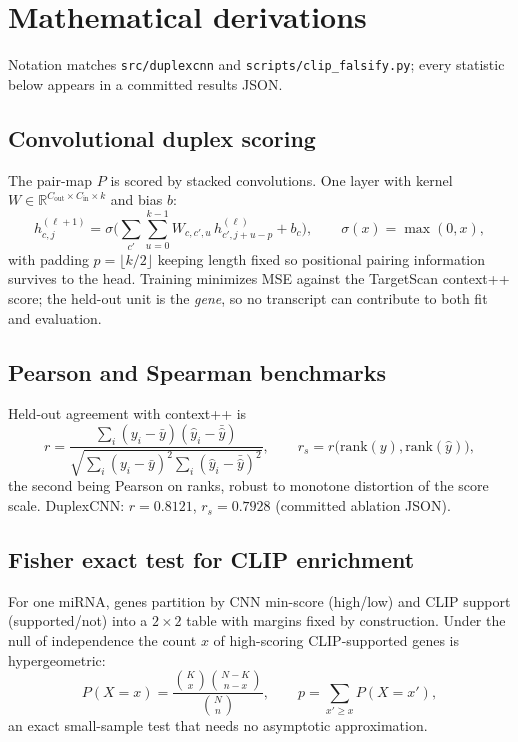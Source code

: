 \section{Mathematical derivations}
Notation matches \texttt{src/duplexcnn} and \texttt{scripts/clip\_falsify.py};
every statistic below appears in a committed results JSON.

\subsection{Convolutional duplex scoring}
The pair-map $P$ is scored by stacked convolutions. One layer with kernel $W\in\mathbb R^{C_{\text{out}}\times C_{\text{in}}\times k}$ and bias $b$:
\begin{equation}
h^{(\ell+1)}_{c,j}=\sigma\Big(\sum_{c'}\sum_{u=0}^{k-1}W_{c,c',u}\,h^{(\ell)}_{c',j+u-p}+b_c\Big),\qquad
\sigma(x)=\max(0,x),
\end{equation}
with padding $p=\lfloor k/2\rfloor$ keeping length fixed so positional pairing
information survives to the head. Training minimizes MSE against the
TargetScan context++ score; the held-out unit is the \emph{gene}, so no
transcript can contribute to both fit and evaluation.

\subsection{Pearson and Spearman benchmarks}
Held-out agreement with context++ is
\begin{equation}
r=\frac{\sum_i(y_i-\bar y)(\hat y_i-\bar{\hat y})}{\sqrt{\sum_i(y_i-\bar y)^2\sum_i(\hat y_i-\bar{\hat y})^2}},\qquad
r_s=r\big(\mathrm{rank}(y),\mathrm{rank}(\hat y)\big),
\end{equation}
the second being Pearson on ranks, robust to monotone distortion of the score
scale. DuplexCNN: $r=0.8121$, $r_s=0.7928$ (committed ablation JSON).

\subsection{Fisher exact test for CLIP enrichment}
For one miRNA, genes partition by CNN min-score (high/low) and CLIP support
(supported/not) into a $2\times2$ table with margins fixed by construction.
Under the null of independence the count $x$ of high-scoring CLIP-supported
genes is hypergeometric:
\begin{equation}
P(X=x)=\frac{\binom{K}{x}\binom{N-K}{n-x}}{\binom{N}{n}},\qquad
p=\sum_{x'\ge x}P(X=x'),
\end{equation}
an exact small-sample test that needs no asymptotic approximation.

